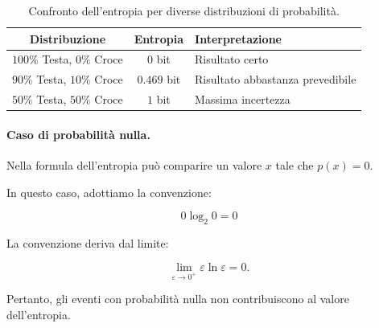 \begin{table}[h]
    \centering
    \begin{tabular}{|c|c|l|}
        \hline
        \textbf{Distribuzione} & \textbf{Entropia} & \textbf{Interpretazione} \\
        \hline
        $100\%$ Testa, $0\%$ Croce & $0$ bit & Risultato certo \\
        \hline
        $90\%$ Testa, $10\%$ Croce & $0.469$ bit & Risultato abbastanza prevedibile \\
        \hline
        $50\%$ Testa, $50\%$ Croce & $1$ bit & Massima incertezza \\
        \hline
    \end{tabular}
    \caption{Confronto dell'entropia per diverse distribuzioni di probabilità.}
    \label{tab:entropia_moneta}
\end{table}

\paragraph{Caso di probabilità nulla.}

Nella formula dell'entropia può comparire un valore $x$ tale che $p(x)=0$.

In questo caso, adottiamo la convenzione:

\[
    \boxed{0\log_2 0=0}
\]

La convenzione deriva dal limite:

\[
    \lim_{\varepsilon\to 0^+}
    \varepsilon\ln\varepsilon=0.
\]

Pertanto, gli eventi con probabilità nulla non contribuiscono al valore dell'entropia.

